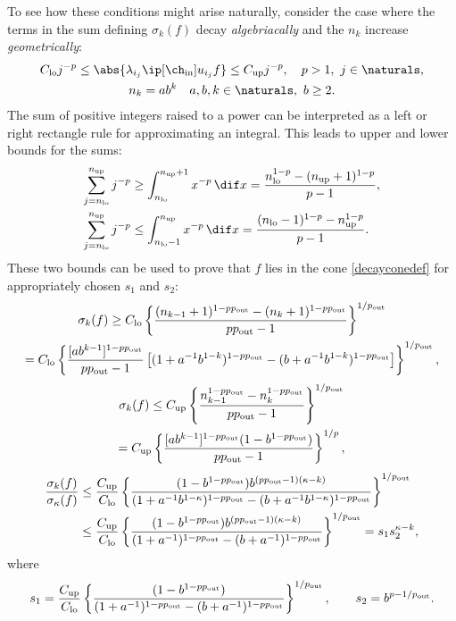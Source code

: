 \documentclass[final]{elsarticle}
\newcommand{\chin}{\ch_{\text{\rm{in}}}}
\newcommand{\pout}{p_{\text{\rm{out}}}}
\theoremstyle{definition}
\theoremstyle{remark}
\DeclareMathOperator{\up}{up}
\DeclareMathOperator{\lo}{lo}
\begin{document}
To see how these conditions might arise naturally, consider the case where the terms in the sum defining $\sigma_k(f)$ decay \emph{algebriacally} and the $n_k$ increase \emph{geometrically}:
\begin{gather*}
C_{\lo} j^{-p} \le \abs{\lambda_{i_j} \ip[\chin]{u_{i_j}}{f}} \le C_{\up} j^{-p}, \quad  p>1, \ j \in \naturals, \\
n_k = a b^k  \quad a, b, k \in \naturals, \ b \ge 2.
\end{gather*}
The sum of positive integers raised to a power can be interpreted as a left or right rectangle rule for approximating an integral.  This leads to upper and lower bounds for the sums:
\begin{align*}
\sum_{j=n_{\lo}}^{n_{\up}} j^{-p}  & \ge \int_{n_{\lo}}^{n_{\up}+1} x^{-p}\, \dif x  = \frac{n_{\lo} ^{1-p} - (n_{\up}+1)^{1-p}}{p-1}, \\
\sum_{j=n_{\lo}}^{n_{\up}} j^{-p}  & \le \int_{n_{\lo}-1}^{n_{\up}} x^{-p}\, \dif x = \frac{(n_{\lo}-1) ^{1-p} - n_{\up}^{1-p}}{p-1}.
\end{align*}
These two bounds can be used to prove that $f$ lies in the cone \eqref{decayconedef} for appropriately chosen $s_1$ and $s_2$:
\begin{multline*}
\sigma_k(f) \ge C_{\lo} \left\{\frac{(n_{k-1}+1) ^{1-p\pout} - (n_{k}+1)^{1-p \pout}}{p \pout-1}\right\}^{1/\pout} \\
= C_{\lo} \left\{\frac{[ab^{k-1}]^{1-p \pout}}{p \pout-1} \left[(1+a^{-1}b^{1-k})^{1-p \pout} - (b+a^{-1}b^{1-k})^{1-p \pout}\right] \right\}^{1/\pout},
\end{multline*}
\begin{multline*}
\sigma_k(f) \le C_{\up}\left\{\frac{n_{k-1} ^{1-p \pout} - n_{k}^{1-p \pout}}{p \pout-1}\right\}^{1/\pout} \\
= C_{\up}\left\{\frac{[ab^{k-1}]^{1-p \pout} (1 - b^{1-p \pout})}{p \pout-1}\right\}^{1/p} ,
\end{multline*}
\begin{align*}
\frac{\sigma_k(f)}{\sigma_\kappa(f)} &\le \frac{C_{\up}}  {C_{\lo}}
\left\{\frac{ (1 - b^{1-p \pout}) b^{(p \pout-1)(\kappa-k)} }  {(1+a^{-1}b^{1-\kappa})^{1-p\pout} - (b+a^{-1}b^{1-\kappa})^{1-p\pout}} \right\}^{1/\pout}\\
& \le \frac{C_{\up}}  {C_{\lo}}
\left\{\frac{(1 - b^{1-p\pout}) b^{(p\pout-1)(\kappa-k)} }  {(1+a^{-1})^{1-p\pout} - (b+a^{-1})^{1-p\pout}} \right\}^{1/\pout}   = s_1 s_2^{\kappa-k},
\end{align*}
where
\[
s_1 = \frac{ C_{\up}}  {C_{\lo}}\left\{\frac{(1 - b^{1-p\pout})}  {(1+a^{-1})^{1-p\pout} - (b+a^{-1})^{1-p\pout} } \right\}^{1/\pout}, \qquad s_2 = b^{p-1/\pout}.
\]
\end{document}
